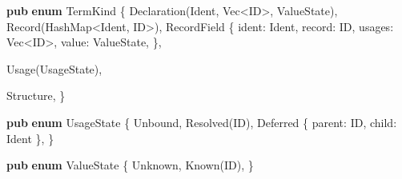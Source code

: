 \documentclass[
  a4paper,
  bibtex,
  english,
  nomenclature]{kthlatex/kththesis/kththesis}
\newenvironment{Shaded}{}{}
\newcommand{\DataTypeTok}[1]{\textcolor[rgb]{0.56,0.13,0.00}{#1}}
\newcommand{\KeywordTok}[1]{\textcolor[rgb]{0.00,0.44,0.13}{\textbf{#1}}}
\newcommand{\NormalTok}[1]{#1}
\newcommand{\OperatorTok}[1]{\textcolor[rgb]{0.40,0.40,0.40}{#1}}
\begin{document}
\begin{codelisting}

\caption{Definition of a linearization items TermKind}

\hypertarget{lst:nls-termkind-definition}{%
\label{lst:nls-termkind-definition}}%
\begin{Shaded}
\begin{Highlighting}[]
\KeywordTok{pub} \KeywordTok{enum}\NormalTok{ TermKind }\OperatorTok{\{}
\NormalTok{    Declaration(Ident}\OperatorTok{,} \DataTypeTok{Vec}\OperatorTok{\textless{}}\NormalTok{ID}\OperatorTok{\textgreater{},}\NormalTok{ ValueState)}\OperatorTok{,}
\NormalTok{    Record(HashMap}\OperatorTok{\textless{}}\NormalTok{Ident}\OperatorTok{,}\NormalTok{ ID}\OperatorTok{\textgreater{}}\NormalTok{)}\OperatorTok{,}
\NormalTok{    RecordField }\OperatorTok{\{}
\NormalTok{        ident}\OperatorTok{:}\NormalTok{ Ident}\OperatorTok{,}
\NormalTok{        record}\OperatorTok{:}\NormalTok{ ID}\OperatorTok{,}
\NormalTok{        usages}\OperatorTok{:} \DataTypeTok{Vec}\OperatorTok{\textless{}}\NormalTok{ID}\OperatorTok{\textgreater{},}
\NormalTok{        value}\OperatorTok{:}\NormalTok{ ValueState}\OperatorTok{,}
    \OperatorTok{\},}

\NormalTok{    Usage(UsageState)}\OperatorTok{,}

\NormalTok{    Structure}\OperatorTok{,}
\OperatorTok{\}}

\KeywordTok{pub} \KeywordTok{enum}\NormalTok{ UsageState }\OperatorTok{\{}
\NormalTok{    Unbound}\OperatorTok{,}
\NormalTok{    Resolved(ID)}\OperatorTok{,}
\NormalTok{    Deferred }\OperatorTok{\{}\NormalTok{ parent}\OperatorTok{:}\NormalTok{ ID}\OperatorTok{,}\NormalTok{ child}\OperatorTok{:}\NormalTok{ Ident }\OperatorTok{\},}
\OperatorTok{\}}

\KeywordTok{pub} \KeywordTok{enum}\NormalTok{ ValueState }\OperatorTok{\{}
\NormalTok{    Unknown}\OperatorTok{,}
\NormalTok{    Known(ID)}\OperatorTok{,}
\OperatorTok{\}}
\end{Highlighting}
\end{Shaded}

\end{codelisting}
\end{document}
